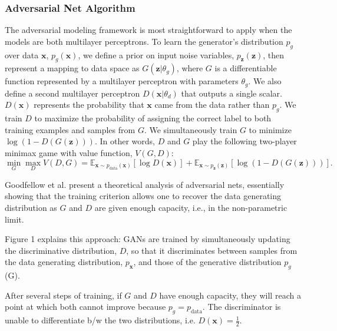 \subsubsection*{Adversarial Net Algorithm}
The adversarial modeling framework is most straightforward to apply when the models are both multilayer perceptrons. To learn the generator’s distribution $p_g$ over data $\bm{x}$, $p_g(\bm{x})$, we define a prior on input noise variables, $p_{\bm{z}}(\bm{z})$, then represent a mapping to data space as $G(\bm{z}| \theta_g)$, where $G$ is a differentiable function represented by a multilayer perceptron with parameters $\theta_g$. We also define a second multilayer perceptron $D(\bm{x} | \theta_d)$ that outputs a single scalar. $D(\bm{x})$ represents the probability that $\bm{x}$ came from the data rather than $p_g$. We train $D$ to maximize the probability of assigning the correct label to both training examples and samples from $G$. We simultaneously train $G$ to minimize $ \log(1 - D(G(\bm{z})))$. In other words, $D$ and $G$ play the following two-player minimax game with value function, $V(G,D)$:
\[
	\min_G\max_D V(D,G) =
	\mathbb{E}_{\bm{x}\sim p_{\text{data}}(\bm{x})}
	\left[ \log D(\bm{x}) \right]
	+
	\mathbb{E}_{\bm{x}\sim p_{\bm{z}}(\bm{z})}
	\left[ \log\left( 1 - D(G(\bm{z})) \right) \right].
\]

Goodfellow et al. present a theoretical analysis of adversarial nets, essentially showing that the training criterion allows one to recover the data generating distribution as $G$ and $D$ are given enough capacity, i.e., in the non-parametric limit.

Figure 1 explains this approach: GANs are trained by simultaneously updating the discriminative distribution, $D$, so that it discriminates between samples from the data generating distribution, $p_{\bm{x}}$, and those of the generative distribution $p_g$ (G).

After several steps of training, if $G$ and $D$ have enough capacity, they will reach a point at which both cannot improve because $p_g=p_{\text{data}}$. The discriminator is unable to differentiate b/w the two distributions, i.e. $D(\bm{x})=\frac{1}{2}$.


